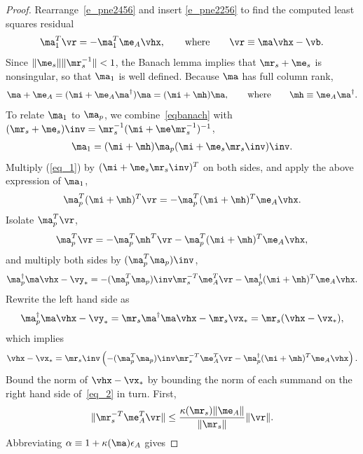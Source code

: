 \documentclass[final]{siamart220329}%
\begin{document}
\begin{proof}
Rearrange~\eqref{e_pne2456} and insert \eqref{e_pne2256} 
to find the computed least squares residual
\begin{align}\label{eq_1}
        \ma_1^T\vr=-\ma_1^T\me_A\vhx, \qquad \text{where}\qquad
        \vr\equiv \ma\vhx-\vb.
    \end{align}
Since $\|\me_s\|\|\mr_s^{-1}\|<1$, the Banach lemma \cite[Lemma 2.3.3]{GovL13} implies that $\mr_s+\me_s$ is nonsingular, so that $\ma_1$ is well defined. Because $\ma$ has full column rank, 
\begin{align}\ma+\me_A=(\mi+\me_A\ma^\dagger)\ma=(\mi+\mh)\ma, \qquad \text{where}\qquad
\mh\equiv\me_A\ma^\dagger.\label{eqbanach}
\end{align} 
To relate $\ma_1$ to $\ma_p$, we combine~\eqref{eqbanach} with $(\mr_s+\me_s)\inv=\mr_s^{-1}(\mi+\me\mr_s^{-1})^{-1}$,
\begin{align*}
\ma_1=(\mi+\mh)\ma_p(\mi+\me_s\mr_s\inv)\inv.
\end{align*}
Multiply (\ref{eq_1}) by $(\mi+\me_s\mr_s\inv)^T$ on both sides, and apply the above expression of $\ma_1$,
\begin{align*}
    \ma_p^T(\mi+\mh)^T\vr=-\ma_p^T(\mi+\mh)^T\me_A\vhx.
\end{align*}
 Isolate $\ma_p^T\vr$,
 \begin{align*}
    \ma_p^T\vr= -\ma_p^T\mh^T\vr-\ma_p^T(\mi+\mh)^T\me_A\vhx,
\end{align*}
and multiply both sides by $(\ma_p^T\ma_p)\inv$,
\begin{align*}
    \ma_p^\dagger\ma\vhx-\vy_*= -(\ma_p^T\ma_p)\inv\mr_s^{-T}\me_A^T\vr-\ma_p^\dagger(\mi+\mh)^T\me_A\vhx.
\end{align*}
Rewrite the left hand side as
\begin{align*}
     \ma_p^\dagger\ma\vhx-\vy_*=\mr_s\ma^\dagger\ma\vhx-\mr_s\vx_*=\mr_s(\vhx-\vx_*),
\end{align*}
which implies \begin{align}\label{eq_2}
    \vhx-\vx_*=\mr_s\inv\left(-(\ma_p^T\ma_p)\inv\mr_s^{-T}\me_A^T\vr-\ma_p^\dagger(\mi+\mh)^T\me_A\vhx\right).
\end{align}
Bound the norm of $ \vhx-\vx_*$ by bounding the norm of each summand on the right hand side of~\eqref{eq_2} in turn. 
First, \begin{align}\label{eq_3}
    \|\mr_s^{-T}\me_A^T\vr\|\leq\frac{\kappa(\mr_s)\|\me_A\|}{\|\mr_s\|}\|\vr\|.
\end{align}
Abbreviating $\alpha\equiv 1+\kappa(\ma)\epsilon_A$ gives

\end{proof}
\end{document}
